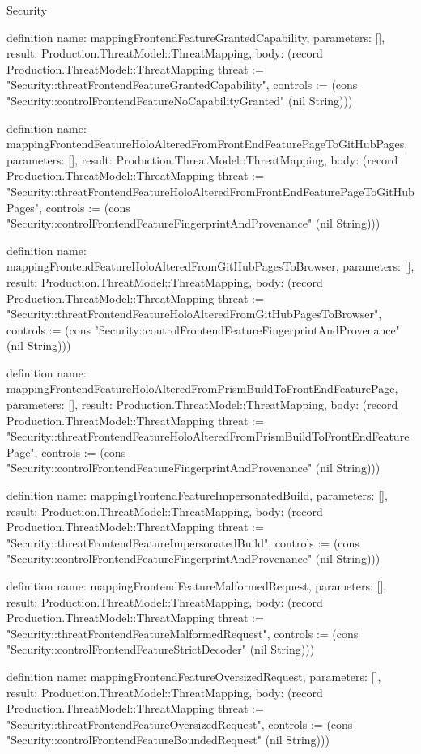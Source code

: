 \begin{lexlean}{Security}
\begin{semanticmodule}
definition{
  name: mappingFrontendFeatureGrantedCapability,
  parameters: [],
  result: Production.ThreatModel::ThreatMapping,
  body: (record Production.ThreatModel::ThreatMapping {threat := "Security::threatFrontendFeatureGrantedCapability", controls := (cons "Security::controlFrontendFeatureNoCapabilityGranted" (nil String))})
}

definition{
  name: mappingFrontendFeatureHoloAlteredFromFrontEndFeaturePageToGitHubPages,
  parameters: [],
  result: Production.ThreatModel::ThreatMapping,
  body: (record Production.ThreatModel::ThreatMapping {threat := "Security::threatFrontendFeatureHoloAlteredFromFrontEndFeaturePageToGitHubPages", controls := (cons "Security::controlFrontendFeatureFingerprintAndProvenance" (nil String))})
}

definition{
  name: mappingFrontendFeatureHoloAlteredFromGitHubPagesToBrowser,
  parameters: [],
  result: Production.ThreatModel::ThreatMapping,
  body: (record Production.ThreatModel::ThreatMapping {threat := "Security::threatFrontendFeatureHoloAlteredFromGitHubPagesToBrowser", controls := (cons "Security::controlFrontendFeatureFingerprintAndProvenance" (nil String))})
}

definition{
  name: mappingFrontendFeatureHoloAlteredFromPrismBuildToFrontEndFeaturePage,
  parameters: [],
  result: Production.ThreatModel::ThreatMapping,
  body: (record Production.ThreatModel::ThreatMapping {threat := "Security::threatFrontendFeatureHoloAlteredFromPrismBuildToFrontEndFeaturePage", controls := (cons "Security::controlFrontendFeatureFingerprintAndProvenance" (nil String))})
}

definition{
  name: mappingFrontendFeatureImpersonatedBuild,
  parameters: [],
  result: Production.ThreatModel::ThreatMapping,
  body: (record Production.ThreatModel::ThreatMapping {threat := "Security::threatFrontendFeatureImpersonatedBuild", controls := (cons "Security::controlFrontendFeatureFingerprintAndProvenance" (nil String))})
}

definition{
  name: mappingFrontendFeatureMalformedRequest,
  parameters: [],
  result: Production.ThreatModel::ThreatMapping,
  body: (record Production.ThreatModel::ThreatMapping {threat := "Security::threatFrontendFeatureMalformedRequest", controls := (cons "Security::controlFrontendFeatureStrictDecoder" (nil String))})
}

definition{
  name: mappingFrontendFeatureOversizedRequest,
  parameters: [],
  result: Production.ThreatModel::ThreatMapping,
  body: (record Production.ThreatModel::ThreatMapping {threat := "Security::threatFrontendFeatureOversizedRequest", controls := (cons "Security::controlFrontendFeatureBoundedRequest" (nil String))})
}


\end{semanticmodule}
\end{lexlean}
